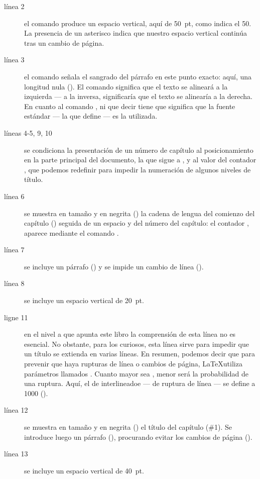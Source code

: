 \begin{description}
\item[línea 2]el comando   produce un espacio vertical, aquí de 50~pt, como indica el 50. La presencia de un asterisco indica que nuestro espacio vertical continúa tras un cambio de página.
\item[línea 3]el comando  señala el sangrado del párrafo en este punto exacto: aquí, una longitud nula (). El comando  significa que el texto se alineará a la izquierda --- a la inversa,  significaría que el texto se alinearía a la derecha. En cuanto al comando , ni que decir tiene que significa que la fuente estándar --- la que define  --- es la utilizada.
\item[líneas 4-5, 9, 10]se condiciona la presentación de un número de capítulo al posicionamiento en la parte principal del documento, la que sigue a , y al valor del contador , que podemos redefinir para impedir la numeración de algunos niveles de título.
\item[línea 6]se muestra en tamaño  y en negrita () la cadena de lengua del comienzo del capítulo () seguida de un espacio y del número del capítulo: el contador , aparece mediante el comando .
\item[línea 7]se incluye un párrafo () y se impide un cambio de línea ().
\item[línea 8]se incluye un espacio vertical de 20~pt.
\item[ligne 11]en el nivel a que apunta este libro la comprensión de esta línea no es esencial. No obstante, para los curiosos, esta línea sirve para impedir que un título se extienda en varias líneas. En resumen, podemos decir que para prevenir que haya rupturas de línea o cambios de página, \LaTeX utiliza parámetros llamados . Cuanto mayor sea , menor será la probabilidad de una ruptura. Aquí, el  de interlineadoe --- de ruptura de línea --- se define a 1000 (). 
\item[línea 12]se muestra en tamaño  y en negrita () el título del capítulo (\#1). Se introduce luego un párrafo (), procurando evitar los cambios de página ().
\item[línea 13]se incluye un espacio vertical de 40~pt.
\end{description}


